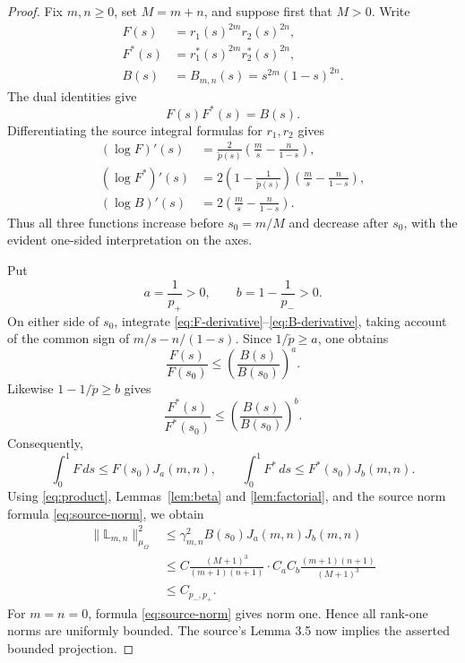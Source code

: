 \documentclass[11pt]{article}
\newcommand{\dd}{\,d}
\newcommand{\Lmn}{\mathbb L_{m,n}}
\newcommand{\pcheck}{\check p}
\begin{document}
\begin{proof}
Fix \(m,n\geq0\), set \(M=m+n\), and suppose first that \(M>0\).  Write
\[
\begin{aligned}
 F(s)&=r_1(s)^{2m}r_2(s)^{2n},\\
 F^*(s)&=r_1^*(s)^{2m}r_2^*(s)^{2n},\\
 B(s)&=B_{m,n}(s)=s^{2m}(1-s)^{2n}.
\end{aligned}
\]
The dual identities give
\begin{equation}\label{eq:product}
 F(s)F^*(s)=B(s).
\end{equation}
Differentiating the source integral formulas for \(r_1,r_2\) gives
\begin{align}
 (\log F)'(s)
 &=\frac{2}{\pcheck(s)}
   \left(\frac m s-\frac n{1-s}\right),\label{eq:F-derivative}\\
 (\log F^*)'(s)
 &=2\left(1-\frac1{\pcheck(s)}\right)
   \left(\frac m s-\frac n{1-s}\right),\label{eq:Fstar-derivative}\\
 (\log B)'(s)
 &=2\left(\frac m s-\frac n{1-s}\right).\label{eq:B-derivative}
\end{align}
Thus all three functions increase before \(s_0=m/M\) and decrease after
\(s_0\), with the evident one-sided interpretation on the axes.

Put
\[
 a=\frac1{p_+}>0,\qquad
 b=1-\frac1{p_-}>0.
\]
On either side of \(s_0\), integrate
\eqref{eq:F-derivative}--\eqref{eq:B-derivative}, taking account of the
common sign of \(m/s-n/(1-s)\).  Since \(1/\pcheck\geq a\), one obtains
\begin{equation}\label{eq:F-beta}
 \frac{F(s)}{F(s_0)}
 \leq\left(\frac{B(s)}{B(s_0)}\right)^a.
\end{equation}
Likewise \(1-1/\pcheck\geq b\) gives
\begin{equation}\label{eq:Fstar-beta}
 \frac{F^*(s)}{F^*(s_0)}
 \leq\left(\frac{B(s)}{B(s_0)}\right)^b.
\end{equation}
Consequently,
\[
\int_0^1F\dd s\leq F(s_0)J_a(m,n),\qquad
\int_0^1F^*\dd s\leq F^*(s_0)J_b(m,n).
\]
Using \eqref{eq:product}, Lemmas~\ref{lem:beta} and
\ref{lem:factorial}, and the source norm formula
\eqref{eq:source-norm}, we obtain
\begin{align*}
\|\Lmn\|_{\mu_\Omega}^2
&\leq
\gamma_{m,n}^2B(s_0)J_a(m,n)J_b(m,n)\\
&\leq
C\frac{(M+1)^3}{(m+1)(n+1)}
\cdot
C_aC_b\frac{(m+1)(n+1)}{(M+1)^3}\\
&\leq C_{p_-,p_+}.
\end{align*}
For \(m=n=0\), formula \eqref{eq:source-norm} gives norm one.  Hence all
rank-one norms are uniformly bounded.  The source's Lemma 3.5 now implies
the asserted bounded projection.
\end{proof}
\end{document}
